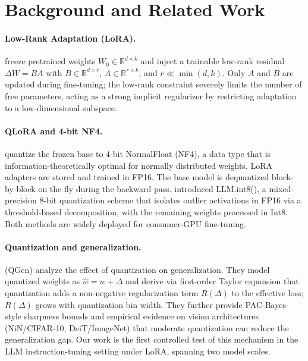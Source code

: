 \documentclass{article}
\begin{document}
\section{Background and Related Work}

\paragraph{Low-Rank Adaptation (LoRA).}
\citet{hu2021lora} freeze pretrained weights $W_0 \in \mathbb{R}^{d \times k}$ and
inject a trainable low-rank residual $\Delta W = BA$ with $B \in \mathbb{R}^{d \times r}$,
$A \in \mathbb{R}^{r \times k}$, and $r \ll \min(d,k)$. Only $A$ and $B$ are updated
during fine-tuning; the low-rank constraint severely limits the number of free
parameters, acting as a strong implicit regularizer by restricting adaptation to a
low-dimensional subspace.

\paragraph{QLoRA and 4-bit NF4.}
\citet{dettmers2023qlora} quantize the frozen base to 4-bit NormalFloat (NF4), a
data type that is information-theoretically optimal for normally distributed weights.
LoRA adapters are stored and trained in FP16. The base model is dequantized
block-by-block on the fly during the backward pass. \citet{dettmers2022llmint8}
introduced LLM.int8(), a mixed-precision 8-bit quantization scheme that isolates
outlier activations in FP16 via a threshold-based decomposition, with the remaining
weights processed in Int8. Both methods are widely deployed for consumer-GPU
fine-tuning.

\paragraph{Quantization and generalization.}
\citet{askarihemmat2024quantization} (QGen) analyze the effect of quantization on
generalization. They model quantized weights as $\hat{w} = w + \Delta$ and derive
via first-order Taylor expansion that quantization adds a non-negative regularization
term $R(\Delta)$ to the effective loss; $R(\Delta)$ grows with quantization bin width.
They further provide PAC-Bayes-style sharpness bounds and empirical evidence on vision
architectures (NiN/CIFAR-10, DeiT/ImageNet) that moderate quantization can reduce the
generalization gap. Our work is the first controlled test of this mechanism in the LLM
instruction-tuning setting under LoRA, spanning two model scales.
\end{document}
